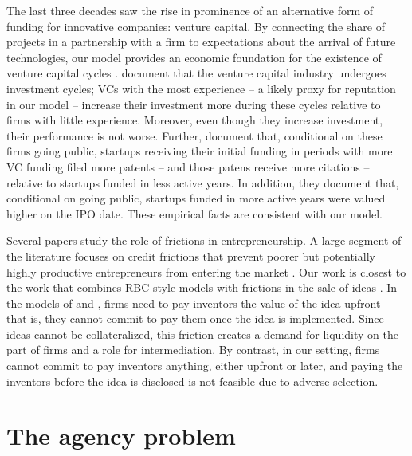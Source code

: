 \documentclass[12pt]{article}
\renewcommand{\cite}{\citet}
\begin{document}
The last three decades saw the rise in prominence of an alternative form of funding for innovative companies: venture capital. By connecting the share of projects in a partnership with a firm to expectations about the arrival of future technologies, our model provides an economic foundation for the existence of venture capital cycles \citep{GompersLerner2006}.   \cite{Gompers2008} document that the venture capital industry undergoes investment cycles; VCs with the most experience -- a likely proxy for reputation in our model -- increase their investment more during these cycles relative to firms with little experience. Moreover, even though they increase investment, their performance is not worse. Further, \cite{Nanda2011} document that, conditional on these firms going public, startups receiving their initial funding in periods with more VC funding filed more patents -- and those patens receive more citations -- relative to startups funded in less active years. In addition, they document that, conditional on going public, startups funded in more active years were valued higher on the IPO date. These empirical facts are consistent with our model.

Several papers study the role of frictions in entrepreneurship. A large segment of the literature focuses on credit frictions that prevent  poorer  but potentially highly productive entrepreneurs from entering the market \citep[see, for instance][]{BanerjeeNewman1993}. Our work is closest to the work that combines RBC-style models with frictions in the sale of ideas \citep[see, for example][]{Wright2010,CMW2011}. In the models of \cite{Wright2010} and  \cite{CMW2011}, firms need to pay inventors the value of the idea upfront -- that is, they cannot commit to pay them once the idea is implemented. Since ideas cannot be collateralized, this friction creates a demand for liquidity on the part of firms and a role for intermediation. By contrast, in our setting, firms cannot commit to pay inventors anything, either upfront or later, and paying the inventors before the idea is disclosed is not feasible due to adverse selection.



\section{The agency problem}\label{sec:agency}
\end{document}
